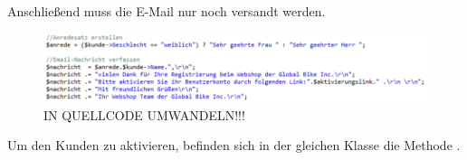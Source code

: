 Anschließend muss die E-Mail nur noch versandt werden.

\begin{figure}[H]
\begin{center}
\includegraphics[width=12cm]{Bilder/Michael_Quellcode3.png}
\end{center}
\caption{IN QUELLCODE UMWANDELN!!!}
\end{figure}

Um den Kunden zu aktivieren, befinden sich in der gleichen Klasse die Methode \grqq{}. 